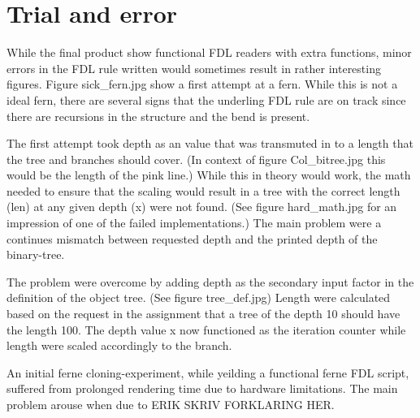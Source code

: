\documentclass[titlepage]{article}
\begin{document}
\section{Trial and error}
While the final product show functional FDL readers with extra functions, minor errors in the FDL rule written would sometimes result in rather interesting figures. Figure sick_fern.jpg  show a first attempt at a fern. While this is not a ideal fern, there are several signs that the underling FDL rule are on track since there are recursions in the structure and the bend is present. \par
The first attempt took depth as an value that was transmuted in to a length that the tree and branches should cover. (In context of figure Col_bitree.jpg  this would be the length of the pink line.) 
While this in theory would work, the math needed to ensure that the scaling would result in a tree with the correct length (len) at any given depth (x) were not found. (See figure hard_math.jpg  for an impression of one of the failed implementations.) The main problem were a continues mismatch between requested depth and the printed depth of the binary-tree. \par
The problem were overcome by adding depth as the secondary input factor in the definition of the object tree. (See figure tree_def.jpg)  Length were calculated based on the request in the assignment that a tree of the depth 10 should have the length 100. The depth value x now functioned as the iteration counter while length were scaled accordingly to the branch.\par  
An initial ferne cloning-experiment, while yeilding a functional ferne FDL script, suffered from prolonged rendering time due to hardware limitations. The main problem arouse when due to ERIK SKRIV FORKLARING HER.
\end{document}
